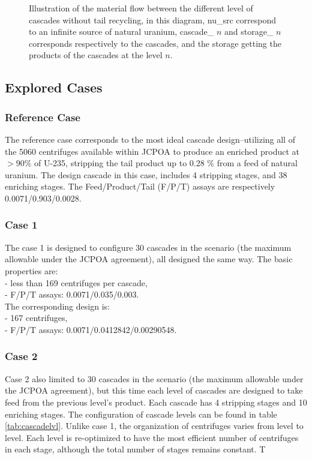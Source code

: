\documentclass{anstrans}
\begin{document}
\begin{figure}[ht]
  \caption{Illustration of the material flow between the different level of
      cascades without tail recycling, in this diagram, nu\_src correspond to an
      infinite source of natural uranium, cascade\_ $n$ and storage\_ $n$
      corresponds respectively to the cascades, and the storage getting the
  products of the cascades at the level $n$.}\label{fig:flow}
\end{figure}

\subsection{Explored Cases}
\subsubsection{Reference Case}
The reference case corresponds to the most ideal cascade design--utilizing all of the 5060
centrifuges available within JCPOA to produce an enriched product at $>90\%$ of U-235,
stripping the tail product up to 0.28 $\%$ from a feed of natural uranium.
The design cascade in this case, includes 4 stripping stages, and 38 enriching
stages. The Feed/Product/Tail (F/P/T) assays are respectively
0.0071/0.903/0.0028.

\subsubsection{Case 1}
The case 1 is designed to configure 30 cascades in the scenario (the maximum allowable under
the JCPOA agreement), all designed the same way. The basic properties are:\\
- less than 169 centrifuges per cascade,\\
- F/P/T assays: 0.0071/0.035/0.003.\\
The corresponding design is:\\
- 167 centrifuges,\\
- F/P/T assays: 0.0071/0.0412842/0.00290548.\\

\subsubsection{Case 2} Case 2 also limited to 30 cascades in the scenario (the
maximum allowable under the JCPOA agreement), but this time each level of
cascades are designed to take feed from the previous level's product. Each
cascade has 4 stripping stages and 10 enriching stages. The configuration of
cascade levels can be found in table \ref{tab:cascadelvl}. Unlike case 1, the
organization of centrifuges varies from level to level. Each level is re-optimized
to have the most efficient number of centrifuges in each stage, although the total number
of stages remains constant. T
\end{document}
